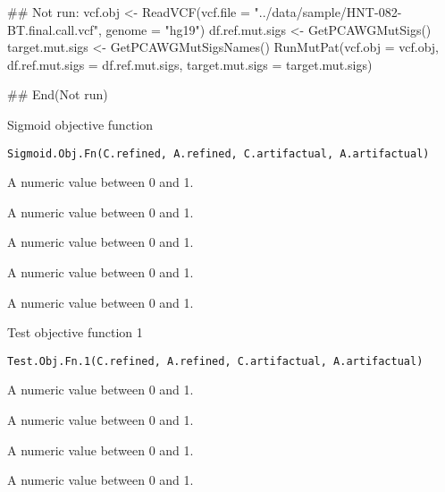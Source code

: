 \documentclass[letterpaper]{book}
\begin{document}
%
\begin{Examples}
\begin{ExampleCode}
## Not run: 
vcf.obj <- ReadVCF(vcf.file = "../data/sample/HNT-082-BT.final.call.vcf", genome = "hg19")
df.ref.mut.sigs <- GetPCAWGMutSigs()
target.mut.sigs <- GetPCAWGMutSigsNames()
RunMutPat(vcf.obj = vcf.obj,
df.ref.mut.sigs = df.ref.mut.sigs,
target.mut.sigs = target.mut.sigs)

## End(Not run)
\end{ExampleCode}
\end{Examples}
%
\begin{Description}\relax
Sigmoid objective function
\end{Description}
%
\begin{Usage}
\begin{verbatim}
Sigmoid.Obj.Fn(C.refined, A.refined, C.artifactual, A.artifactual)
\end{verbatim}
\end{Usage}
%
\begin{Arguments}
\begin{ldescription}
\item[\code{C.refined}] A numeric value between 0 and 1.

\item[\code{A.refined}] A numeric value between 0 and 1.

\item[\code{C.artifactual}] A numeric value between 0 and 1.

\item[\code{A.artifactual}] A numeric value between 0 and 1.
\end{ldescription}
\end{Arguments}
%
\begin{Value}
A numeric value between 0 and 1.
\end{Value}
%
\begin{Description}\relax
Test objective function 1
\end{Description}
%
\begin{Usage}
\begin{verbatim}
Test.Obj.Fn.1(C.refined, A.refined, C.artifactual, A.artifactual)
\end{verbatim}
\end{Usage}
%
\begin{Arguments}
\begin{ldescription}
\item[\code{C.refined}] A numeric value between 0 and 1.

\item[\code{A.refined}] A numeric value between 0 and 1.

\item[\code{C.artifactual}] A numeric value between 0 and 1.

\item[\code{A.artifactual}] A numeric value between 0 and 1.
\end{ldescription}
\end{Arguments}
\end{document}
